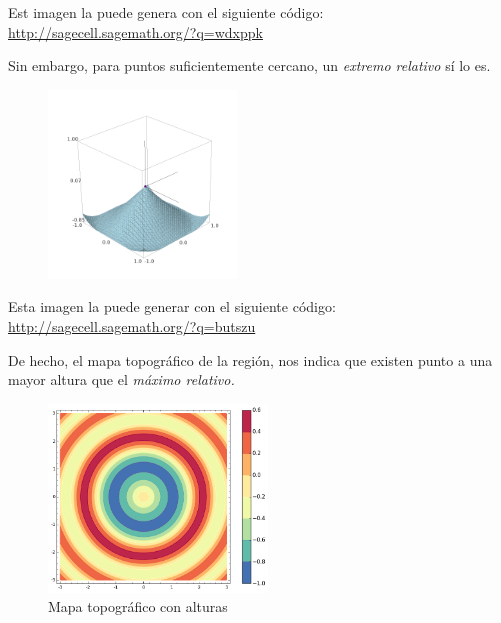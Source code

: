 Est imagen la puede genera con el siguiente c\'odigo: \href{http://sagecell.sagemath.org/?z=eJw9jkFuwyAQRfeWfIeRNwGbUFOrm0rcIVK6r3A8DqjYUMCt3dOXxE1nFqP3pdH7A44wkpVt9LUsIE_AtIQZyFHQelJJ82hmstVbs9YrfdqTz5BIxuYW87ZtBS2LsjiBBG9d6gYyMnLsWEcfB9SgfDJfKN_CggwuzrogK2uuOvV2wQoYTGp973EeJBc7DOiTluIlE0Z9_8yeMbgJoroiv7n4Lvw7YCbvQgK1YiyLc-5zguZORDykh96qy8eBNuCdmRMhLcubK0bzg1I8_5fzS_AWq6w886jdN6G_zYpbDw==&lang=sage}{http://sagecell.sagemath.org/?q=wdxppk}



Sin embargo, para puntos suficientemente cercano, un \emph{extremo relativo} s\'i lo es.
\begin{figure}
	\centering
	\includegraphics[height=5cm,keepaspectratio=true]{./cvv/cvv05.png}
	\label{fig:05}
\end{figure}

Esta imagen la puede generar con el siguiente c\'odigo:
\href{http://sagecell.sagemath.org/?z=eJw9jsFuwyAQRO-W_A8rXwI2pUZVe6jEP0RK7xWO1wEVGwq4xf36krjp7mE0I43ejDjBRDLb6GtdQbmAaQ0LkAdB21klzaNZyNZuXW4zfdyTz5BIsd015n3fC1pXdXUECd669DSSiZU-E_QuoEblk_lC-RZWZHB21gXZWHPRabArNsBgVvl9wGWUXOxmRJ-0FM_FYdS3ZuFMwc0Q1QX5lcV34J-Amb0LCVTGWFensucI3c0RcYceBqvOHwfagXdmSYT0rHyZGM0PSvHyP86vwVtsCvLEo3bfhP4Cx45bCw==&lang=sage}{http://sagecell.sagemath.org/?q=butszu}



De hecho, el mapa topográfico de la regi\'on, nos indica que existen punto a una mayor altura que el \emph{máximo relativo.}

\begin{figure}
	\centering
	\includegraphics[height=5cm,keepaspectratio=true]{./cvv/cvv06.png}
	\caption{Mapa topográfico con alturas}
	\label{fig:06}
\end{figure}

